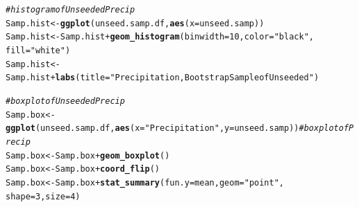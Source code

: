 \documentclass{article}\usepackage[]{graphicx}\usepackage[]{color}
\makeatletter
\newcommand{\hlnum}[1]{\textcolor[rgb]{0.686,0.059,0.569}{#1}}%
\newcommand{\hlstr}[1]{\textcolor[rgb]{0.192,0.494,0.8}{#1}}%
\newcommand{\hlcom}[1]{\textcolor[rgb]{0.678,0.584,0.686}{\textit{#1}}}%
\newcommand{\hlopt}[1]{\textcolor[rgb]{0,0,0}{#1}}%
\newcommand{\hlstd}[1]{\textcolor[rgb]{0.345,0.345,0.345}{#1}}%
\newcommand{\hlkwb}[1]{\textcolor[rgb]{0.69,0.353,0.396}{#1}}%
\newcommand{\hlkwc}[1]{\textcolor[rgb]{0.333,0.667,0.333}{#1}}%
\newcommand{\hlkwd}[1]{\textcolor[rgb]{0.737,0.353,0.396}{\textbf{#1}}}%
\newenvironment{kframe}{%
 \def\at@end@of@kframe{}%
 \ifinner\ifhmode%
  \def\at@end@of@kframe{\end{minipage}}%
  \begin{minipage}{\columnwidth}%
 \fi\fi%
 \def\FrameCommand##1{\hskip\@totalleftmargin \hskip-\fboxsep
 \colorbox{shadecolor}{##1}\hskip-\fboxsep
     \hskip-\linewidth \hskip-\@totalleftmargin \hskip\columnwidth}%
 \MakeFramed {\advance\hsize-\width
   \@totalleftmargin\z@ \linewidth\hsize
   \@setminipage}}%
 {\par\unskip\endMakeFramed%
 \at@end@of@kframe}
\newenvironment{knitrout}{}{} %
\makeatother
\begin{document}
\begin{knitrout}
\color{fgcolor}\begin{kframe}
\begin{alltt}
\hlcom{# histogram of Unseeded Precip}
\hlstd{Samp.hist} \hlkwb{<-} \hlkwd{ggplot}\hlstd{(unseed.samp.df,} \hlkwd{aes}\hlstd{(}\hlkwc{x} \hlstd{= unseed.samp))}
\hlstd{Samp.hist} \hlkwb{<-} \hlstd{Samp.hist} \hlopt{+} \hlkwd{geom_histogram}\hlstd{(}\hlkwc{binwidth} \hlstd{=} \hlnum{10}\hlstd{,}\hlkwc{color} \hlstd{=} \hlstr{"black"}\hlstd{,}
                                            \hlkwc{fill} \hlstd{=} \hlstr{"white"}\hlstd{)}
\hlstd{Samp.hist} \hlkwb{<-} \hlstd{Samp.hist} \hlopt{+} \hlkwd{labs}\hlstd{(}\hlkwc{title} \hlstd{=} \hlstr{"Precipitation, Bootstrap Sample of Unseeded"}\hlstd{)}

\hlcom{# boxplot of Unseeded Precip}
\hlstd{Samp.box} \hlkwb{<-} \hlkwd{ggplot}\hlstd{(unseed.samp.df,} \hlkwd{aes}\hlstd{(}\hlkwc{x} \hlstd{=} \hlstr{"Precipitation"}\hlstd{,}\hlkwc{y} \hlstd{= unseed.samp))} \hlcom{# boxplot of Precip}
\hlstd{Samp.box} \hlkwb{<-} \hlstd{Samp.box} \hlopt{+} \hlkwd{geom_boxplot}\hlstd{()}
\hlstd{Samp.box} \hlkwb{<-} \hlstd{Samp.box} \hlopt{+} \hlkwd{coord_flip}\hlstd{()}
\hlstd{Samp.box} \hlkwb{<-} \hlstd{Samp.box} \hlopt{+} \hlkwd{stat_summary}\hlstd{(}\hlkwc{fun.y} \hlstd{= mean,} \hlkwc{geom} \hlstd{=} \hlstr{"point"}\hlstd{,}
                                        \hlkwc{shape} \hlstd{=} \hlnum{3}\hlstd{,} \hlkwc{size} \hlstd{=} \hlnum{4}\hlstd{)}
\end{alltt}
\end{kframe}
\end{knitrout}
\end{document}
